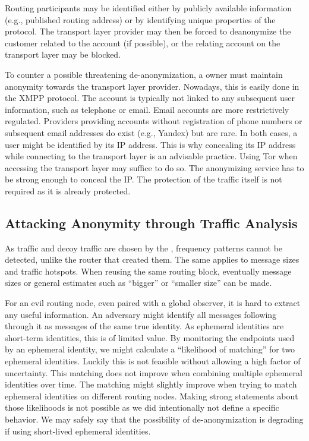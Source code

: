Routing participants may be identified either by publicly available information (e.g., published routing address) or by identifying unique properties of the protocol. The transport layer provider may then be forced to deanonymize the customer related to the account (if possible), or the relating account on the transport layer may be blocked. 

To counter a possible threatening de-anonymization, a \VortexNode{} owner must maintain anonymity towards the transport layer provider. Nowadays, this is easily done in the XMPP protocol. The account is typically not linked to any subsequent user information, such as telephone or email. Email accounts are more restrictively regulated. Providers providing accounts without registration of phone numbers or subsequent email addresses do exist (e.g., Yandex) but are rare. In both cases, a user might be identified by its IP address. This is why concealing its IP address while connecting to the transport layer is an advisable practice. Using Tor when accessing the transport layer may suffice to do so. The anonymizing service has to be strong enough to conceal the IP. The protection of the traffic itself is not required as it is already protected.

\subsection{Attacking Anonymity through Traffic Analysis}
As traffic and decoy traffic are chosen by the , frequency patterns cannot be detected, unlike the router that created them. The same applies to message sizes and traffic hotspots. When reusing the same routing block, eventually message sizes or general estimates such as ``bigger'' or ``smaller size'' can be made.

For an evil routing node, even paired with a global observer, it is hard to extract any useful information. An adversary might identify all messages following through it as messages of the same true identity. As ephemeral identities are short-term identities, this is of limited value. By monitoring the endpoints used by an ephemeral identity, we might calculate a ``likelihood of matching'' for two ephemeral identities. Luckily this is not feasible without allowing a high factor of uncertainty. This matching does not improve when combining multiple ephemeral identities over time. The matching might slightly improve when trying to match ephemeral identities on different routing nodes. Making strong statements about those likelihoods is not possible as we did intentionally not define a specific behavior. We may safely say that the possibility of de-anonymization is degrading if using short-lived ephemeral identities.

